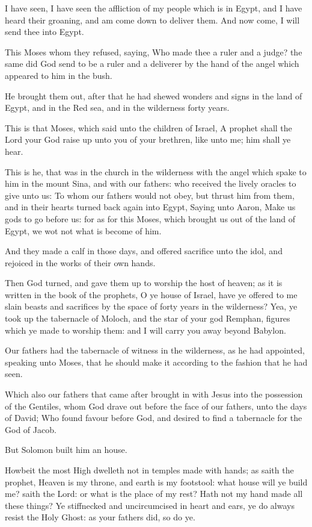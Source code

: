 \verse I have seen, I have seen the affliction of my people which is in Egypt, and I have heard their groaning, and am come down to deliver them. And now come, I will send thee into Egypt.

\verse This Moses whom they refused, saying, Who made thee a ruler and a judge? the same did God send to be a ruler and a deliverer by the hand of the angel which appeared to him in the bush.

\verse He brought them out, after that he had shewed wonders and signs in the land of Egypt, and in the Red sea, and in the wilderness forty years.

\verse This is that Moses, which said unto the children of Israel, A prophet shall the Lord your God raise up unto you of your brethren, like unto me; him shall ye hear.

\verse This is he, that was in the church in the wilderness with the angel which spake to him in the mount Sina, and with our fathers: who received the lively oracles to give unto us: \verse To whom our fathers would not obey, but thrust him from them, and in their hearts turned back again into Egypt, \verse Saying unto Aaron, Make us gods to go before us: for as for this Moses, which brought us out of the land of Egypt, we wot not what is become of him.

\verse And they made a calf in those days, and offered sacrifice unto the idol, and rejoiced in the works of their own hands.

\verse Then God turned, and gave them up to worship the host of heaven; as it is written in the book of the prophets, O ye house of Israel, have ye offered to me slain beasts and sacrifices by the space of forty years in the wilderness?  \verse Yea, ye took up the tabernacle of Moloch, and the star of your god Remphan, figures which ye made to worship them: and I will carry you away beyond Babylon.

\verse Our fathers had the tabernacle of witness in the wilderness, as he had appointed, speaking unto Moses, that he should make it according to the fashion that he had seen.

\verse Which also our fathers that came after brought in with Jesus into the possession of the Gentiles, whom God drave out before the face of our fathers, unto the days of David; \verse Who found favour before God, and desired to find a tabernacle for the God of Jacob.

\verse But Solomon built him an house.

\verse Howbeit the most High dwelleth not in temples made with hands; as saith the prophet, \verse Heaven is my throne, and earth is my footstool: what house will ye build me? saith the Lord: or what is the place of my rest?  \verse Hath not my hand made all these things?  \verse Ye stiffnecked and uncircumcised in heart and ears, ye do always resist the Holy Ghost: as your fathers did, so do ye.

